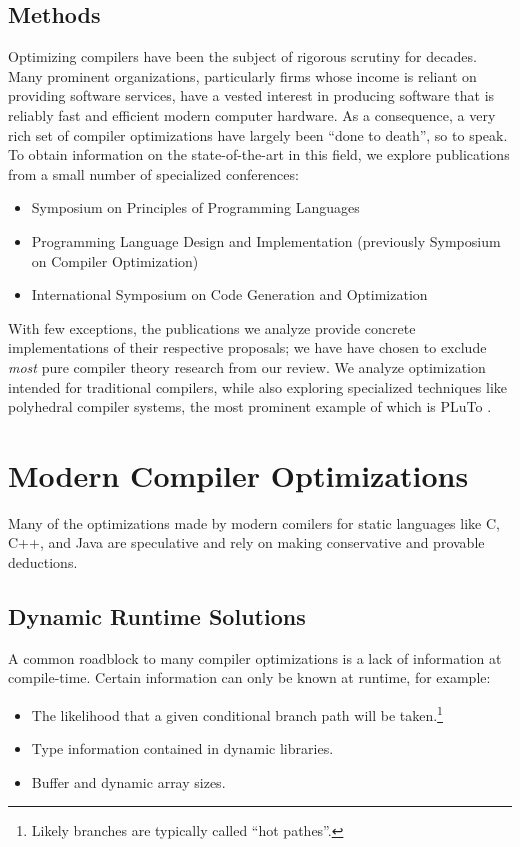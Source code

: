 \documentclass[nobib]{tufte-handout}
\begin{document}
\subsection{Methods}
Optimizing compilers have been the subject of rigorous scrutiny for decades.  Many prominent organizations, particularly firms whose income is reliant on providing software services, have a vested interest in producing software that is reliably fast and efficient modern computer hardware.  As a consequence, a very rich set of compiler optimizations have largely been ``done to death'', so to speak.  To obtain information on the state-of-the-art in this field, we explore publications from a small number of specialized conferences: 
\begin{itemize}
\item Symposium on Principles of Programming Languages
\item Programming Language Design and Implementation (previously Symposium on Compiler Optimization)
\item International Symposium on Code Generation and Optimization
\end{itemize}

With few exceptions, the publications we analyze provide concrete implementations of their respective proposals; we have have chosen to exclude \emph{most} pure compiler theory research from our review.  We analyze optimization intended for traditional compilers, while also exploring specialized techniques like polyhedral compiler systems, the most prominent example of which is PLuTo \cite{Pluto}.  


\section{Modern Compiler Optimizations}
Many of the optimizations made by modern comilers for static languages like C, C++, and Java are speculative and rely on making conservative and provable deductions.  


\subsection{Dynamic Runtime Solutions}
A common roadblock to many compiler optimizations is a lack of information at compile-time.  Certain information can only be known at runtime, for example: 
\begin{itemize}
\item The likelihood that a given conditional branch path will be taken.\footnote{Likely branches are typically called ``hot pathes''.}
\item Type information contained in dynamic libraries.
\item Buffer and dynamic array sizes.
\end{itemize}
\end{document}
